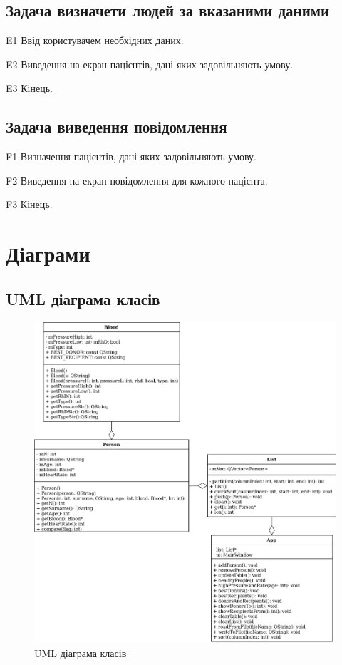\documentclass[oneside,14pt]{extarticle}
\begin{document}
\subsection{Задача визначети людей за вказаними даними}
\begin{list}{}{Алгоритм E.}
	\item [E1] Ввід користувачем необхідних даних.
	\item [E2] Виведення на екран пацієнтів, дані яких задовільняють умову.
	\item [E3] Кінець.
\end{list}

\subsection{Задача виведення повідомлення}
\begin{list}{}{Алгоритм F.}
	\item [F1] Визначення пацієнтів, дані яких задовільняють умову.
	\item [F2] Виведення на екран повідомлення для кожного пацієнта. 
	\item [F3] Кінець.
\end{list}

\section{Діаграми}
\subsection{UML діаграма класів}
\begin{figure}[H]
	\centering
	\includegraphics[scale=0.3]{1}
	\caption{UML діаграма класів}
\end{figure}
\end{document}
